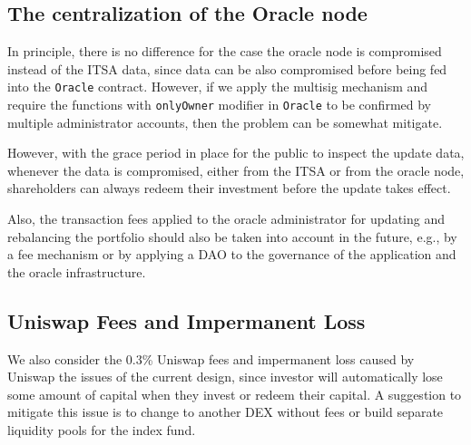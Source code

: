 \subsection{The centralization of the Oracle node}

In principle, there is no difference for the case the oracle node is compromised instead of the ITSA data, since data can be also compromised before being fed into the \texttt{Oracle} contract. However, if we apply the multisig mechanism and require the functions  with \texttt{onlyOwner} modifier in \texttt{Oracle} to be confirmed by multiple administrator accounts, then the problem can be somewhat mitigate.


However, with the grace period in place for the public to inspect the update data, whenever the data is compromised, either from the ITSA or from the oracle node, shareholders can always redeem their investment before the update takes effect.

Also, the transaction fees applied to the oracle administrator for updating and rebalancing the portfolio should also be taken into account in the future, e.g., by a fee mechanism or by applying a DAO to the governance of the application and the oracle infrastructure.



\subsection{Uniswap Fees and Impermanent Loss}

We also consider the 0.3\% Uniswap fees and impermanent loss caused by Uniswap the issues of the current design, since investor will automatically lose some amount of capital when they invest or redeem their capital. A suggestion to mitigate this issue is to change to another DEX without fees or build separate liquidity pools for the index fund.














































